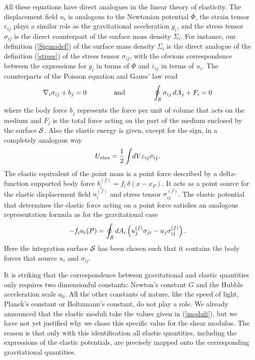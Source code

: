 \documentclass[a4paper,12pt]{article}
\newcommand{\be}{\begin{equation}}
\newcommand{\ee}{\end{equation}}
\begin{document}
All these equations have direct analogues in the linear theory of elasticity.  The displacement field $u_i$ is analogous to the Newtonian potential $\Phi$,  the strain tensor $\varepsilon_{ij}%
$ plays a similar role as the gravitational acceleration $g_i %
$, and the stress tensor $\sigma_{ij}$ is the direct counterpart of the surface mass density $\Sigma_i$.  
For instance,  our definition (\ref{Sigmadef}) of the surface mass density $\Sigma_i$ is the direct analogue of the definition (\ref{stress}) of the stress tensor $\sigma_{ij}$, with the obvious correspondence between the expressions for $g_i$ in terms of $\Phi$ and $\varepsilon_{ij}$ in terms of  $u_i$.  The counterparts of the Poisson equation and Gauss' law read\\[-1mm]
\be
\nabla_i \sigma_{ij}+b_j  = 0 \qquad \qquad\mbox{and} \qquad \qquad \oint_{\cal S} \sigma_{ij} \,dA_j + F_i =0\\
\ee 
where the body force $b_j$ represents the force per unit of volume that acts on the medium and $F_j$ is the total force acting on the part of the medium enclosed by the surface ${\cal S}$. Also the elastic energy is given, except for the sign, in a completely analogous way 
\begin{equation}
U_{elas} ={1\over 2} \int \!dV \varepsilon_{ij} \sigma_{ij}	 .
\end{equation}
The elastic equivalent of the point mass is a point force described by 
a delta-function supported body force 
$ b_i^{(f)} \! = \! f_i\, \delta(x\!-\!x_P) $. 
It acts as a point source for the elastic displacement field $u_i^{(f)}$ and stress tensor $
\sigma_{ij}^{(f)}$. The elastic potential that determines the elastic force acting on a point force satisfies an analogous representation formula as for the gravitational case
\begin{equation}
	-f_i u_i(P) = \oint_{\cal S} dA_i \left(  u_j^{(f)} \sigma_{ji}  -  u_j   \sigma_{ij}^{(f)} \right)  .
\end{equation}
Here the integration surface $\cal S$ has   been chosen   such that it contains  the   body forces that source $u_i$ and $\sigma_{ij}$. 

It is striking that the correspondence between gravitational and elastic quantities only requires two dimensionful constants:  Newton's constant $G$ and the Hubble acceleration scale $a_0$.   All the other constants of nature, like the speed of light, Planck's constant or Boltzmann's constant, do not play a role. We already announced that the elastic moduli take the values given in (\ref{moduli}), but we have not yet justified why we chose this specific value for the shear modulus. The reason is that only with this identification all elastic quantities, including the expressions of the elastic potentials, are precisely mapped onto the corresponding gravitational quantities. 
\end{document}

